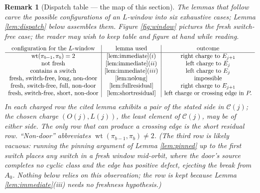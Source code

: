 \documentclass[11pt]{article}
\newtheorem{remark}[theorem]{Remark}
\DeclareMathOperator{\wt}{wt}
\begin{document}
\begin{remark}[Dispatch table --- the map of this section]\label{rem:dispatchtable}
The lemmas that follow carve the possible configurations of an \(L\)-window into six exhaustive
cases; Lemma \ref{lem:dispatch} below assembles them.  Figure \ref{fig:window} pictures the
fresh switch-free case; the reader may wish to keep table and figure at hand while reading.
\[
\begin{array}{c|c|c}
\text{configuration for the \(L\)-window} & \text{lemma used} & \text{outcome}\\ \hline
\wt(\pi_{b-1},\pi_b)=2 & \ref{lem:immediate}(i) & \text{right charge to }E_{j+1}\\
\text{not fresh} & \ref{lem:immediate}(ii) & \text{left charge to }E_j\\
\text{contains a switch} & \ref{lem:immediate}(iii) & \text{left charge to }E_j\\
\text{fresh, switch-free, long, non-door} & \ref{lem:nolong} & \text{impossible}\\
\text{fresh, switch-free, full, non-door} & \ref{lem:fullresidual} & \text{right charge to }E_{j+1}\\
\text{fresh, switch-free, short, non-door} & \ref{lem:shortresidual} &
  \text{left charge or crossing edge in }P .
\end{array}
\]
In each charged row the cited lemma exhibits a pair of the stated side in \(\mathcal C(j)\); the
chosen charge \((O(j),L(j))\), the least element of \(\mathcal C(j)\), may be of either side.
The only row that can produce a crossing edge is the short residual row.  ``Non-door'' abbreviates
\(\wt(\pi_{b-1},\pi_b)\ne 2\).  (The third row is likely vacuous: running the pinning argument of
Lemma \ref{lem:pinned} up to the first switch places any switch in a \emph{fresh} window
mid-orbit, where the door's source completes no cyclic class and the edge has positive defect,
ejecting the break from \(A_0\).  Nothing below relies on this observation; the row is kept
because Lemma \ref{lem:immediate}(iii) needs no freshness hypothesis.)
\end{remark}
\end{document}
